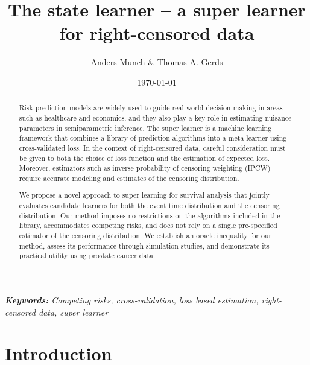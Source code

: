 \documentclass[a4paper,danish]{article}
\title{The state learner -- a super learner for right-censored
  data}
\author{Anders Munch \& Thomas A. Gerds}
\date{\today}
\theoremstyle{plain} %
\numberwithin{theorem}{section}
\theoremstyle{definition} %
\theoremstyle{remark}
\newcommand{\1}{\mathds{1}}
\begin{document}
\maketitle


\begin{abstract} Risk prediction models are widely used to guide
real-world decision-making in areas such as healthcare and economics,
and they also play a key role in estimating nuisance parameters in
semiparametric inference. The super learner is a machine learning
framework that combines a library of prediction algorithms into a
meta-learner using cross-validated loss. In the context of
right-censored data, careful consideration must be given to both the
choice of loss function and the estimation of expected loss. Moreover,
estimators such as inverse probability of censoring weighting (IPCW)
require accurate modeling and estimates of the censoring distribution.

We propose a novel approach to super learning for survival analysis
that jointly evaluates candidate learners for both the event time
distribution and the censoring distribution. Our method imposes no
restrictions on the algorithms included in the library, accommodates
competing risks, and does not rely on a single pre-specified estimator
of the censoring distribution. We establish an oracle inequality for
our method, assess its performance through simulation studies, and
demonstrate its practical utility using prostate cancer data.
\end{abstract}

\textit{\textbf{Keywords:} Competing risks, cross-validation,
  loss based estimation, right-censored data, super learner}

\section{Introduction}
\label{sec:introduction}
\end{document}
